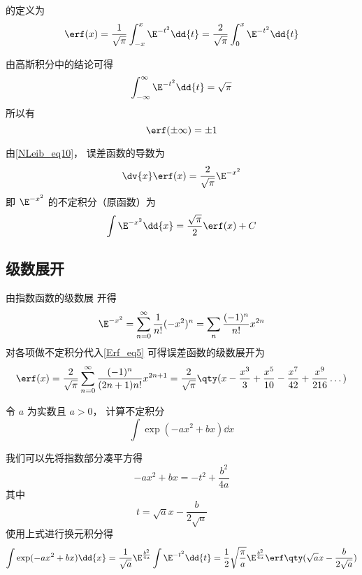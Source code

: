 

的定义为%
\begin{equation}\label{Erf_eq1}
\erf(x) = \frac{1}{\sqrt{\pi}} \int_{-x}^x \E^{-t^2} \dd{t}
= \frac{2}{\sqrt{\pi}} \int_{0}^x \E^{-t^2} \dd{t}
\end{equation}

由高斯积分中的结论可得
\begin{equation}
\int_{-\infty}^\infty \E^{-t^2} \dd{t} = \sqrt{\pi}
\end{equation}
所以有
\begin{equation}
\erf(\pm\infty) = \pm 1
\end{equation}

由\autoref{NLeib_eq10}， 误差函数的导数为
\begin{equation}
\dv{x} \erf(x) = \frac{2}{\sqrt{\pi}} \E^{-x^2}
\end{equation}
即 $\E^{-x^2}$ 的不定积分（原函数）为
\begin{equation}\label{Erf_eq5}
\int \E^{-x^2} \dd{x} = \frac{\sqrt{\pi}}{2} \erf(x) + C
\end{equation}

\subsection{级数展开}
由指数函数的级数展%
开得
\begin{equation}
\E^{-x^2} = \sum_{n=0}^\infty \frac{1}{n!} (-x^2)^n = \sum_n \frac{(-1)^n}{n!} x^{2n}
\end{equation}
对各项做不定积分代入\autoref{Erf_eq5} 可得误差函数的级数展开为
\begin{equation}
\erf(x) = \frac{2}{\sqrt{\pi}} \sum_{n=0}^\infty \frac{(-1)^n}{(2n+1)n!} x^{2n+1}
= \frac{2}{\sqrt{\pi}}\qty(x - \frac{x^3}{3} + \frac{x^5}{10} - \frac{x^7}{42} + \frac{x^9}{216} \dots)
\end{equation}

\begin{example}{}\label{Erf_ex1}
令 $a$ 为实数且 $a > 0$， 计算不定积分
\begin{equation}
\int \exp(-ax^2 + bx) \dd{x}
\end{equation}

我们可以先将指数部分凑平方得
\begin{equation}
-ax^2 + bx = -t^2 + \frac{b^2}{4a}
\end{equation}
其中
\begin{equation}
t = \sqrt{a} x - \frac{b}{2\sqrt{a}} \qquad
\end{equation}
使用上式进行换元积分得
\begin{equation}
\int \exp(-ax^2 + bx) \dd{x} = \frac{1}{\sqrt{a}} \E^{\frac{b^2}{4a}} \int \E^{-t^2} \dd{t}
= \frac12 \sqrt{\frac{\pi}{a}} \E^{\frac{b^2}{4a}} \erf\qty(\sqrt{a} x - \frac{b}{2\sqrt{a}})
\end{equation}
\end{example}

